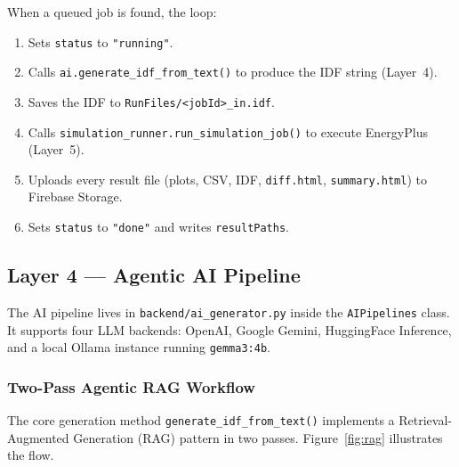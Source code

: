 \documentclass[12pt, a4paper]{article}
\begin{document}
When a queued job is found, the loop:
\begin{enumerate}[nosep]
  \item Sets \texttt{status} to \texttt{"running"}.
  \item Calls \texttt{ai.generate\_idf\_from\_text()} to produce the IDF string (Layer~4).
  \item Saves the IDF to \texttt{RunFiles/<jobId>\_in.idf}.
  \item Calls \texttt{simulation\_runner.run\_simulation\_job()} to execute EnergyPlus (Layer~5).
  \item Uploads every result file (plots, CSV, IDF, \texttt{diff.html}, \texttt{summary.html}) to Firebase Storage.
  \item Sets \texttt{status} to \texttt{"done"} and writes \texttt{resultPaths}.
\end{enumerate}

\subsection{Layer 4 --- Agentic AI Pipeline}

The AI pipeline lives in \texttt{backend/ai\_generator.py} inside the \texttt{AIPipelines} class. It supports four LLM backends: OpenAI, Google Gemini, HuggingFace Inference, and a local Ollama instance running \texttt{gemma3:4b}.

\subsubsection{Two-Pass Agentic RAG Workflow}

The core generation method \texttt{generate\_idf\_from\_text()} implements a Retrieval-Augmented Generation (RAG) pattern in two passes. Figure~\ref{fig:rag} illustrates the flow.
\end{document}
